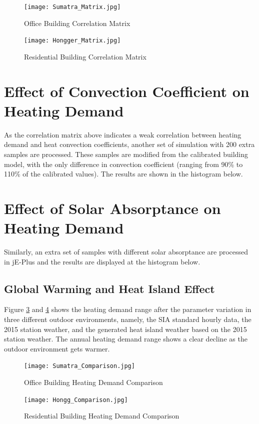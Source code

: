 		
	    \begin{figure}[H]
		\centering
		\texttt{[image: Sumatra\_Matrix.jpg]}
		\caption{Office Building Correlation Matrix}
		\label{fig:Sumatra_Matrix}
		\end{figure}
			
	    \begin{figure}[H]
		\centering
		\texttt{[image: Hongger\_Matrix.jpg]}
		\caption{Residential Building Correlation Matrix}
		\label{fig:Hongg_Matrix}
		\end{figure}


	\section{Effect of Convection Coefficient on Heating Demand}
        	As the correlation matrix above indicates a weak correlation between heating demand and heat convection coefficients, another set of simulation with 200 extra samples are processed. These samples are modified from the calibrated building model, with the only difference in convection coefficient (ranging from 90\% to 110\% of the calibrated values). The results are shown in the histogram below.\\
        	
        	
    \section{Effect of Solar Absorptance on Heating Demand}
			Similarly, an extra set of samples with different solar absorptance are processed in jE-Plus and the results are displayed at the histogram below.\\
			

        \subsection{Global Warming and Heat Island Effect}
		Figure \ref{fig:Sumatra_Comp} and \ref{fig:Hongg_Comp} shows the heating demand range after the parameter variation in three different outdoor environments, namely, the SIA standard hourly data, the 2015 station weather, and the generated heat island weather based on the 2015 station weather. The annual heating demand range shows a clear decline as the outdoor environment gets warmer.

	    \begin{figure}[H]
		\centering
		\texttt{[image: Sumatra\_Comparison.jpg]}
		\caption{Office Building Heating Demand Comparison}
		\label{fig:Sumatra_Comp}
		\end{figure}

	    \begin{figure}[H]
		\centering
		\texttt{[image: Hongg\_Comparison.jpg]}
		\caption{Residential Building Heating Demand Comparison}
		\label{fig:Hongg_Comp}
		\end{figure}
		